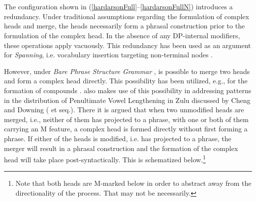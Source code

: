 \documentclass[output=paper,colorlinks,citecolor=brown,
]{langscibook}
\begin{document}
\begin{exe}
\begin{multicols}{2}
		\ex	~ \label{hardarsonFull}\\
		\ex	~ \label{hardarsonFullN} \\
	\end{multicols}

\end{exe}

\noindent The configuration shown in (\ref{hardarsonFull}--\ref{hardarsonFullN}) introduces a redundancy. Under traditional assumptions regarding the formulation of complex heads and merge, the heads necessarily form a phrasal construction prior to the formulation of the complex head. In the absence of any DP-internal modifiers, these operations apply vacuously. This redundancy has been used as an argument for \textit{Spanning}, i.e. vocabulary insertion targeting non-terminal nodes \citep[e.g.,][]{svenonius2016}.

However, under \textit{Bare Phrase Structure Grammar} \citep{Chomsky:1995uq}, is possible to merge two heads and form a complex head directly. This possibility has been utilized, e.g., for the formation of compounds \citep[e.g.,][]{Josefsson:1997te,josefsson1998,zhang2007,Siddiqi:2009tm,okubo2013,Hardarson:2018vo}. \cite{hardarson2020} also makes use of this possibility in addressing patterns in the distribution of Penultimate Vowel Lengthening in Zulu discussed by Cheng and Downing (\citeyear{Cheng:2007um} et seq.). There it is argued that when two unmodified heads are merged, i.e., neither of them has projected to a phrase, with one or both of them carrying an M feature, a complex head is formed directly without first forming a phrase. If either of the heads is modified, i.e. has projected to a phrase, the merger will result in a phrasal construction and the formation of the complex head will take place post-syntactically. This is schematized below.\footnote{Note that both heads are M-marked below in order to abstract away from the directionality of the process. That may not be necessarily.}
\end{document}
